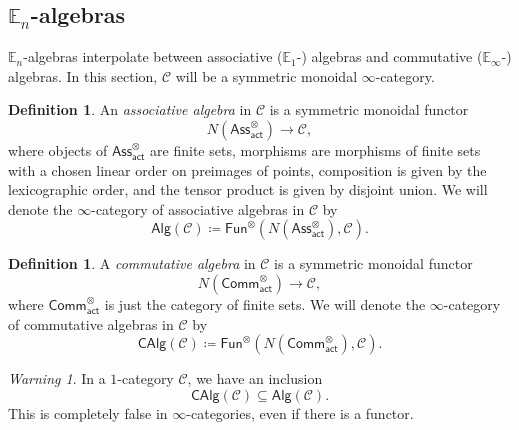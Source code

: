 \documentclass[10pt, oneside]{memoir}
\theoremstyle{definition}
\newtheorem{defn}[thm]{Definition}
\theoremstyle{remark}
\newtheorem{warn}[thm]{Warning}
\theoremstyle{plain}
\theoremstyle{definition}
\theoremstyle{remark}
\newcommand{\E}{\mathbb{E}}
\newcommand{\mc}[1]{\mathcal{#1}}
\newcommand{\ms}[1]{\mathsf{#1}}
\newcommand{\1}{\mathbf{1}}
\newcommand{\2}{\mathbf{2}}
\newcommand{\3}{\mathbf{3}}
\begin{document}
\subsection{$\E_n$-algebras}%
\label{sub:En-algebras}

$\E_n$-algebras interpolate between associative ($\E_1$-) algebras and commutative ($\E_{\infty}$-) algebras. In this section, $\mc{C}$ will be a symmetric monoidal $\infty$-category.

\begin{defn}
    An \textit{associative algebra} in $\mc{C}$ is a symmetric monoidal functor
    \[ N(\ms{Ass}_{\ms{act}}^{\otimes}) \to \mc{C}, \]
    where objects of $\ms{Ass}_{\ms{act}}^{\otimes}$ are finite sets, morphisms are morphisms of finite sets with a chosen linear order on preimages of points, composition is given by the lexicographic order, and the tensor product is given by disjoint union. We will denote the $\infty$-category of associative algebras in $\mc{C}$ by
    \[ \ms{Alg}(\mc{C}) \coloneqq \ms{Fun}^{\otimes}(N(\ms{Ass}_{\ms{act}}^{\otimes}), \mc{C}). \]
\end{defn}

\begin{defn}
    A \textit{commutative algebra} in $\mc{C}$ is a symmetric monoidal functor
    \[ N(\ms{Comm}_{\ms{act}}^{\otimes}) \to \mc{C}, \]
    where $\ms{Comm}_{\ms{act}}^{\otimes}$ is just the category of finite sets. We will denote the $\infty$-category of commutative algebras in $\mc{C}$ by
    \[ \ms{CAlg}(\mc{C}) \coloneqq \ms{Fun}^{\otimes}(N(\ms{Comm}_{\ms{act}}^{\otimes}), \mc{C}). \]
\end{defn}

\begin{warn}
    In a $1$-category $\mc{C}$, we have an inclusion
    \[ \ms{CAlg}(\mc{C}) \subseteq \ms{Alg}(\mc{C}). \]
    This is completely false in $\infty$-categories, even if there is a functor.
\end{warn}
\end{document}
